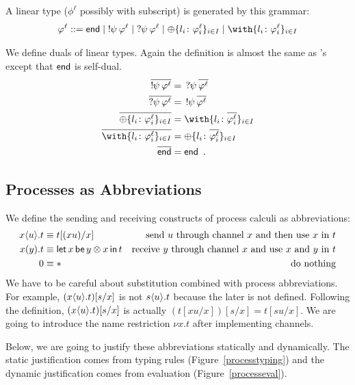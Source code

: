     A linear type ($\phi^\ell$ possibly with subscript) is generated by
    this grammar:
    \[
     \phi^\ell ::= \terminate\mid
     \sendtype{\psi}{\phi^\ell} \mid
     \recvtype{\psi}{\phi^\ell}
     \mid \oplus\{l_i\colon\phi^\ell_i\}_{i\in I}
     \mid \with\{l_i\colon\phi^\ell_i\}_{i\in I}
    \]

    We define duals of linear types.
    Again the definition is almost the
    same as \citet{wadler2012propositions}'s except that $\mathsf{end}$ is
    self-dual.
    \begin{align*}
     \overline{\sendtype\psi{\phi^\ell}}&= \,\recvtype\psi{\overline{\phi^\ell}}\\
     \overline{\recvtype\psi{\phi^\ell}}&= \,\sendtype\psi{\overline{\phi^\ell}}\\
     \overline{\oplus\{l_i\colon \phi^\ell_i\}_{i\in I}} &=
     \with\{l_i\colon \overline{\phi^\ell_i}\}_{i\in I} \\
     \overline{\with\{l_i\colon \phi^\ell_i\}_{i\in I}} &=
     \oplus\{l_i\colon \overline{\phi^\ell_i}\}_{i\in I} \\
     \overline{\terminate} &= \terminate\enspace.
    \end{align*}

    \subsection{Processes as Abbreviations}

    We define the sending and receiving constructs of process calculi as
    abbreviations:
    \begin{align*}
     {x}\langle{u}\rangle.{t} &\equiv t[(xu) /x] &\text{send $u$ through channel
     $x$ and then use $x$ in $t$} \\
     {{x}({y}).{t}} &\equiv \mathsf{let }\,{x}\,\mathsf{ be }\,{y\otimes x}\,\mathsf{ in }\,{t} & \text{receive
     $y$ through channel $x$ and use $x$ and $y$ in $t$} \\
     0 &\equiv \ast &\text{do nothing}
    \end{align*}
    We have to be careful about substitution combined with process
    abbreviations.
    For example, $({x}\langle{u}\rangle.{t})[s/x]$ is not ${s}\langle{u}\rangle.{t}$
    because the later is not defined.  Following the definition,
    $({x}\langle{u}\rangle.{t})[s/x]$ is actually $(t[xu/x])[s/x] = t[su/x]$.
    We are going to introduce the name restriction $\nu x.t$ after
    implementing channels.

    Below, we are going to justify these abbreviations statically and
    dynamically.
    The static justification comes from typing rules
    (Figure~\ref{processtyping}) and the dynamic justification comes from
    evaluation (Figure~\ref{processeval}).


